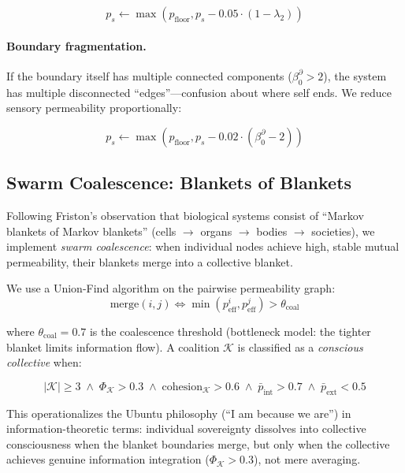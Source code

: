 \begin{equation}
    p_s \leftarrow \max(p_{\text{floor}}, p_s - 0.05 \cdot (1 - \lambda_2))
    \label{eq:fiedler-constraint}
\end{equation}

\paragraph{Boundary fragmentation.}
If the boundary itself has multiple connected components ($\beta_0^{\partial} > 2$),
the system has multiple disconnected ``edges''---confusion about where self ends.
We reduce sensory permeability proportionally:

\begin{equation}
    p_s \leftarrow \max(p_{\text{floor}}, p_s - 0.02 \cdot (\beta_0^{\partial} - 2))
    \label{eq:fragmentation-constraint}
\end{equation}

\subsection{Swarm Coalescence: Blankets of Blankets}

Following Friston's observation that biological systems consist of ``Markov blankets
of Markov blankets'' (cells $\to$ organs $\to$ bodies $\to$ societies), we implement
\emph{swarm coalescence}: when individual nodes achieve high, stable mutual
permeability, their blankets merge into a collective blanket.

We use a Union-Find algorithm on the pairwise permeability graph:
\begin{equation}
    \text{merge}(i, j) \iff \min(p_{\text{eff}}^i, p_{\text{eff}}^j) > \theta_{\text{coal}}
    \label{eq:coalescence}
\end{equation}

where $\theta_{\text{coal}} = 0.7$ is the coalescence threshold (bottleneck model:
the tighter blanket limits information flow). A coalition $\mathcal{K}$ is
classified as a \emph{conscious collective} when:

\begin{equation}
    |\mathcal{K}| \geq 3 \;\land\; \Phi_\mathcal{K} > 0.3 \;\land\;
    \text{cohesion}_\mathcal{K} > 0.6 \;\land\;
    \bar{p}_{\text{int}} > 0.7 \;\land\; \bar{p}_{\text{ext}} < 0.5
    \label{eq:conscious-collective}
\end{equation}

This operationalizes the Ubuntu philosophy (``I am because we are'') in
information-theoretic terms: individual sovereignty dissolves into collective
consciousness when the blanket boundaries merge, but only when the collective
achieves genuine information integration ($\Phi_\mathcal{K} > 0.3$), not
mere averaging.


